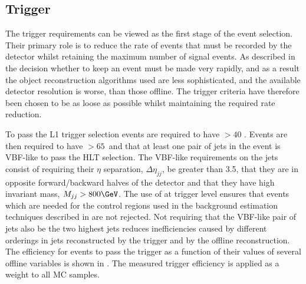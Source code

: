 \subsection{Trigger}
\label{sec:prompttrig}
The trigger requirements can be viewed as the first stage of the event selection. Their primary role is to reduce the rate of events that must be recorded by the detector whilst retaining the maximum number of signal events. As described in  the decision whether to keep an event must be made very rapidly, and as a result the object reconstruction algorithms used are less sophisticated, and the available detector resolution is worse, than those offline. The trigger criteria have therefore been chosen to be as loose as possible whilst maintaining the required rate reduction.

To pass the \ac{L1} trigger selection events are required to have \MET$>40$ \GeV. Events are then required to have \METnoMU$>65$\GeV\, and that at least one pair of jets in the event is \ac{VBF}-like to pass the \ac{HLT} selection. The \ac{VBF}-like requirements on the jets consist of requiring their $\eta$ separation, $\Delta\eta_{jj}$, be greater than 3.5, that they are in opposite forward/backward halves of the detector and that they have high invariant mass, $M_{jj}>800 \GeV$. The use of \METnoMU at trigger level ensures that events which are needed for the control regions used in the background estimation techniques described in  are not rejected. Not requiring that the \ac{VBF}-like pair of jets also be the two highest \pt jets reduces inefficiencies caused by different \pt orderings in jets reconstructed by the trigger and by the offline reconstruction. The efficiency for events to pass the trigger as a function of their values of several offline variables is shown in . The measured trigger efficiency is applied as a weight to all \ac{MC} samples.

